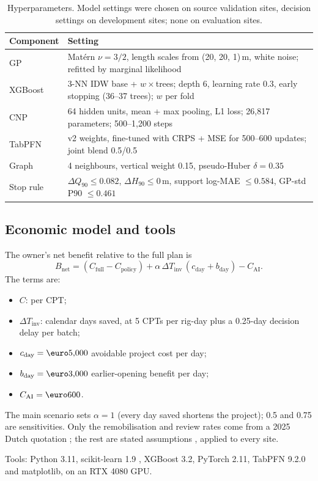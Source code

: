 \begin{table}[!htb]
\centering\small
\caption{Hyperparameters. Model settings were chosen on source validation sites, decision settings on
development sites; none on evaluation sites.}
\label{tab:hyper}
\begin{tabularx}{\linewidth}{@{}lX@{}}
\toprule
Component & Setting\\
\midrule
GP & Mat\'ern $\nu=3/2$, length scales from (20, 20, 1)\,m, white noise; refitted by marginal likelihood\\
XGBoost & 3-NN IDW base + $w\times$trees; depth 6, learning rate 0.3, early stopping (36--37 trees); $w$ per fold\\
CNP & 64 hidden units, mean + max pooling, L1 loss; 26,817 parameters; 500--1,200 steps\\
TabPFN & v2 weights, fine-tuned with CRPS + MSE for 500--600 updates; joint blend 0.5/0.5\\
Graph & 4 neighbours, vertical weight 0.15, pseudo-Huber $\delta=0.35$\\
Stop rule & $\Delta Q_{90}\le0.082$, $\Delta H_{90}\le0$\,m, support log-MAE $\le0.584$, GP-std P90 $\le0.461$\\
\bottomrule
\end{tabularx}
\end{table}

\subsection{Economic model and tools}
The owner's net benefit relative to the full plan is
\begin{equation}
B_{\text{net}}=(C_{\text{full}}-C_{\text{policy}})+\alpha\,\Delta T_{\text{inv}}\,(c_{\text{day}}+b_{\text{day}})-C_{\text{AI}}.
\end{equation}
The terms are:
\begin{itemize}
\item $C$:  per CPT;
\item $\Delta T_{\text{inv}}$: calendar days saved, at 5 CPTs per rig-day plus a 0.25-day decision delay per
  batch;
\item $c_{\text{day}}=\eur{5,000}$ avoidable project cost per day;
\item $b_{\text{day}}=\eur{3,000}$ earlier-opening benefit per day;
\item $C_{\text{AI}}=\eur{600}$.
\end{itemize}
The main scenario sets $\alpha=1$ (every day saved shortens the project); 0.5 and 0.75 are sensitivities.
Only the remobilisation and review rates come from a 2025 Dutch quotation \parencite{mos2025quote}; the rest
are stated assumptions \parencite{gao2015schedule,gao2020cost}, applied to every site.

Tools: Python 3.11, scikit-learn 1.9 \parencite{pedregosa2011sklearn}, XGBoost 3.2, PyTorch 2.11,
TabPFN 9.2.0 \parencite{priorlabs_tabpfn} and matplotlib, on an RTX 4080 GPU.
